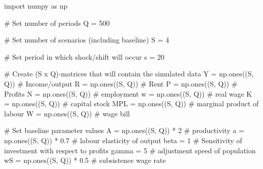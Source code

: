 \documentclass[
  letterpaper,
  DIV=11,
  numbers=noendperiod]{scrreprt}
\newenvironment{Shaded}{\begin{snugshade}}{\end{snugshade}}
\newcommand{\CommentTok}[1]{\textcolor[rgb]{0.37,0.37,0.37}{#1}}
\newcommand{\DecValTok}[1]{\textcolor[rgb]{0.68,0.00,0.00}{#1}}
\newcommand{\FloatTok}[1]{\textcolor[rgb]{0.68,0.00,0.00}{#1}}
\newcommand{\ImportTok}[1]{\textcolor[rgb]{0.00,0.46,0.62}{#1}}
\newcommand{\NormalTok}[1]{\textcolor[rgb]{0.00,0.23,0.31}{#1}}
\newcommand{\OperatorTok}[1]{\textcolor[rgb]{0.37,0.37,0.37}{#1}}
\begin{document}
\begin{tcolorbox}[enhanced jigsaw, titlerule=0mm, breakable, bottomrule=.15mm, toprule=.15mm, colbacktitle=quarto-callout-note-color!10!white, rightrule=.15mm, toptitle=1mm, opacityback=0, left=2mm, coltitle=black, title=\textcolor{quarto-callout-note-color}{\faInfo}\hspace{0.5em}{Python code}, colframe=quarto-callout-note-color-frame, opacitybacktitle=0.6, leftrule=.75mm, bottomtitle=1mm, arc=.35mm, colback=white]

\begin{Shaded}
\begin{Highlighting}[]
\ImportTok{import}\NormalTok{ numpy }\ImportTok{as}\NormalTok{ np}

\CommentTok{\# Set number of periods}
\NormalTok{Q }\OperatorTok{=} \DecValTok{500}

\CommentTok{\# Set number of scenarios (including baseline)}
\NormalTok{S }\OperatorTok{=} \DecValTok{4}

\CommentTok{\# Set period in which shock/shift will occur}
\NormalTok{s }\OperatorTok{=} \DecValTok{20}

\CommentTok{\# Create (S x Q){-}matrices that will contain the simulated data}
\NormalTok{Y }\OperatorTok{=}\NormalTok{ np.ones((S, Q))  }\CommentTok{\# Income/output}
\NormalTok{R }\OperatorTok{=}\NormalTok{ np.ones((S, Q))  }\CommentTok{\# Rent}
\NormalTok{P }\OperatorTok{=}\NormalTok{ np.ones((S, Q))  }\CommentTok{\# Profits}
\NormalTok{N }\OperatorTok{=}\NormalTok{ np.ones((S, Q))  }\CommentTok{\# employment}
\NormalTok{w }\OperatorTok{=}\NormalTok{ np.ones((S, Q))  }\CommentTok{\# real wage}
\NormalTok{K }\OperatorTok{=}\NormalTok{ np.ones((S, Q))  }\CommentTok{\# capital stock}
\NormalTok{MPL }\OperatorTok{=}\NormalTok{ np.ones((S, Q))  }\CommentTok{\# marginal product of labour}
\NormalTok{W }\OperatorTok{=}\NormalTok{ np.ones((S, Q))  }\CommentTok{\# wage bill}

\CommentTok{\# Set baseline parameter values}
\NormalTok{A }\OperatorTok{=}\NormalTok{ np.ones((S, Q)) }\OperatorTok{*} \DecValTok{2}  \CommentTok{\# productivity}
\NormalTok{a }\OperatorTok{=}\NormalTok{ np.ones((S, Q)) }\OperatorTok{*} \FloatTok{0.7}  \CommentTok{\# labour elasticity of output}
\NormalTok{beta }\OperatorTok{=} \DecValTok{1}  \CommentTok{\# Sensitivity of investment with respect to profits}
\NormalTok{gamma }\OperatorTok{=} \DecValTok{5}  \CommentTok{\# adjustment speed of population}
\NormalTok{wS }\OperatorTok{=}\NormalTok{ np.ones((S, Q)) }\OperatorTok{*} \FloatTok{0.5}  \CommentTok{\# subsistence wage rate}


\end{Highlighting}
\end{Shaded}
\end{tcolorbox}
\end{document}
